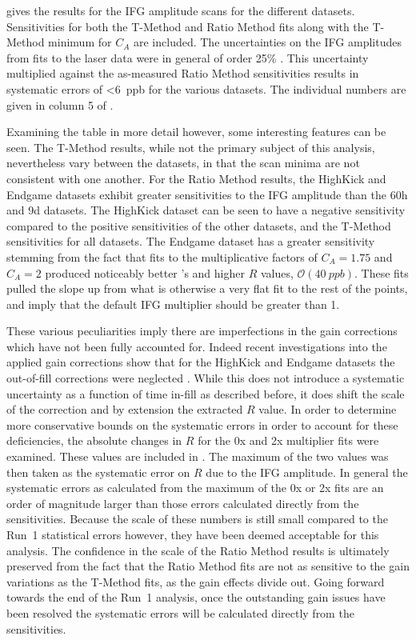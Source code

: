  gives the results for the IFG amplitude scans for the different datasets. Sensitivities for both the T-Method and Ratio Method fits along with the T-Method minimum for $C_{A}$ are included. The uncertainties on the IFG amplitudes from fits to the laser data were in general of order 25\% \cite{AnnaPersonalComm}. This uncertainty multiplied against the as-measured Ratio Method sensitivities results in systematic errors of \SI{<6}{ppb} for the various datasets. The individual numbers are given in column 5 of .


Examining the table in more detail however, some interesting features can be seen. The T-Method results, while not the primary subject of this analysis, nevertheless vary between the datasets, in that the scan minima are not consistent with one another. For the Ratio Method results, the HighKick and Endgame datasets exhibit greater sensitivities to the IFG amplitude than the 60h and 9d datasets. The HighKick dataset can be seen to have a negative sensitivity compared to the positive sensitivities of the other datasets, and the T-Method sensitivities for all datasets. The Endgame dataset has a greater sensitivity stemming from the fact that fits to the multiplicative factors of $C_{A} = 1.75$ and $C_{A} = 2$ produced noticeably better \chisq's and higher $R$ values, $\mathcal{O}(\SI{40}{ppb})$. These fits pulled the slope up from what is otherwise a very flat fit to the rest of the points, and imply that the default IFG multiplier should be greater than 1.


These various peculiarities imply there are imperfections in the gain corrections which have not been fully accounted for. Indeed recent investigations into the applied gain corrections show that for the HighKick and Endgame datasets the out-of-fill corrections were neglected \cite{GainOscEndgameHighKick}. While this does not introduce a systematic uncertainty as a function of time in-fill as described before, it does shift the scale of the correction and by extension the extracted $R$ value. In order to determine more conservative bounds on the systematic errors in order to account for these deficiencies, the absolute changes in $R$ for the 0x and 2x multiplier fits were examined. These values are included in . The maximum of the two values was then taken as the systematic error on $R$ due to the IFG amplitude. In general the systematic errors as calculated from the maximum of the 0x or 2x fits are an order of magnitude larger than those errors calculated directly from the sensitivities. Because the scale of these numbers is still small compared to the Run~1 statistical errors however, they have been deemed acceptable for this analysis. The confidence in the scale of the Ratio Method results is ultimately preserved from the fact that the Ratio Method fits are not as sensitive to the gain variations as the T-Method fits, as the gain effects divide out. Going forward towards the end of the Run~1 analysis, once the outstanding gain issues have been resolved the systematic errors will be calculated directly from the sensitivities.


